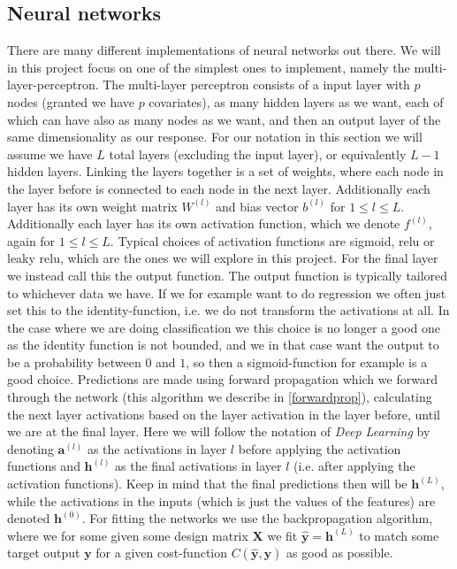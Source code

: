 \documentclass{article}
\begin{document}
\subsection{Neural networks}
There are many different implementations of neural networks out there. We will
in this project focus on one of the simplest ones to implement, namely the
multi-layer-perceptron. The multi-layer perceptron consists of a input layer
with $p$ nodes (granted we have $p$ covariates), as many hidden layers as we
want, each of which can have also as many nodes as we want, and then an output
layer of the same dimensionality as our response. For our notation in this
section we will assume we have $L$ total layers (excluding the input layer), or
equivalently $L-1$ hidden layers. Linking the layers together is a set of
weights, where each node in the layer before is connected to each node in the
next layer. Additionally each layer has its own weight matrix $W^{(l)}$ and bias
vector $b^{(l)}$ for $1 \leq l \leq L$. Additionally each layer has its own
activation function, which we denote $f^{(l)}$, again for $1 \leq l \leq
      L$. Typical choices of activation functions are sigmoid, relu or leaky relu,
which are the ones we will explore in this project. For the final layer we
instead call this the output function. The output function is typically tailored
to whichever data we have. If we for example want to do regression we often just
set this to the identity-function, i.e. we do not transform the activations at
all. In the case where we are doing classification we this choice is no longer a
good one as the identity function is not bounded, and we in that case want the
output to be a probability between $0$ and $1$, so then a sigmoid-function for
example is a good choice. Predictions are made using forward propagation which
we forward through the network (this algorithm we describe in
\ref{forwardprop}), calculating the next layer activations based on the layer
activation in the layer before, until we are at the final layer. Here we will
follow the notation of \textit{Deep Learning}\cite{goodfellow2016deep} by
denoting $\bm{a}^{(l)}$ as the activations in layer $l$ before applying the
activation functions and $\bm{h}^{(l)}$ as the final activations in layer $l$
(i.e. after applying the activation functions). Keep in mind that the final
predictions then will be $\bm{h}^{(L)}$, while the activations in the inputs
(which is just the values of the features) are denoted $\bm{h}^{(0)}$. For
fitting the networks we use the backpropagation algorithm, where we for some
given some design matrix $\bm{X}$ we fit $\hat{\bm{y}} = \bm{h}^{(L)}$ to match
some target output $\bm{y}$ for a given cost-function $C(\hat{\bm{y}}, \bm{y})$
as good as possible.
\end{document}
